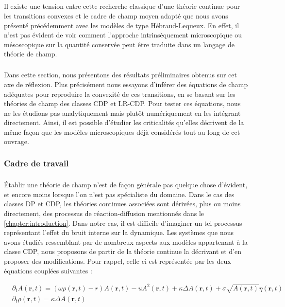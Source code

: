 \subparagraph{}Il existe une tension entre cette recherche classique d'une théorie continue pour les transitions convexes et le cadre de champ moyen adapté que nous avons présenté précédemment avec les modèles de type Hébraud-Lequeux. En effet, il n'est pas évident de voir comment l'approche intrinsèquement microscopique ou mésoscopique sur la quantité conservée peut être traduite dans un langage de théorie de champ.

\subparagraph{}Dans cette section, nous présentons des résultats préliminaires obtenus sur cet axe de réflexion. Plus précisément nous essayons d'inférer des équations de champ adéquates pour reproduire la convexité de ces transitions, en se basant sur les théories de champ des classes CDP et LR-CDP. Pour tester ces équations, nous ne les étudions pas analytiquement mais plutôt numériquement en les intégrant directement. Ainsi, il est possible d'étudier les criticalités qu'elles décrivent de la même façon que les modèles microscopiques déjà considérés tout au long de cet ouvrage.

\subsubsection{Cadre de travail}

\subparagraph{}Établir une théorie de champ n'est de façon générale pas quelque chose d'évident, et encore moins lorsque l'on n'est pas spécialiste du domaine. Dans le cas des classes DP et CDP, les théories continues associées sont dérivées, plus ou moins directement, des processus de réaction-diffusion mentionnés dans le \autoref{chapter:introduction}. Dans notre cas, il est difficile d'imaginer un tel processus représentant l'effet du bruit interne sur la dynamique. Les systèmes que nous avons étudiés ressemblant par de nombreux aspects aux modèles appartenant à la classe CDP, nous proposons de partir de la théorie continue la décrivant et d'en proposer des modifications. Pour rappel, celle-ci est représentée par les deux équations couplées suivantes :

\begin{equation}
\begin{aligned}
	&\partial_t A(\mathbf{r}, t) = (\omega\rho (\mathbf{r}, t) - r)A(\mathbf{r}, t) - uA^2(\mathbf{r}, t) + \kappa\Delta A (\mathbf{r}, t) + \sigma \sqrt{A(\mathbf{r}, t)} \eta(\mathbf{r}, t)\\
	&\partial_t \rho (\mathbf{r}, t) = \kappa\Delta A (\mathbf{r}, t)
\end{aligned}
\label{eq:CDP2}
\end{equation}

